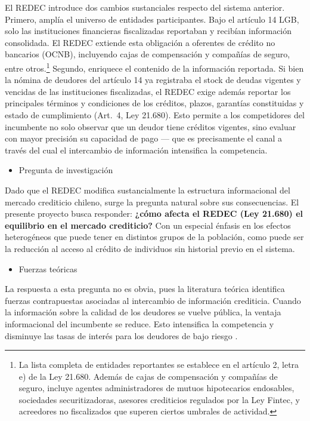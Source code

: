 \documentclass[11pt]{article}
\theoremstyle{plain}
\theoremstyle{plain}
\begin{document}
El REDEC introduce dos cambios sustanciales respecto del sistema anterior. Primero, amplía el universo de entidades participantes. Bajo el artículo 14 LGB, solo las instituciones financieras fiscalizadas reportaban y recibían información consolidada. El REDEC extiende esta obligación a oferentes de crédito no bancarios (OCNB), incluyendo cajas de compensación y compañías de seguro, entre otros.\footnote{La lista completa de entidades reportantes se establece en el artículo 2, letra e) de la Ley 21.680. Además de cajas de compensación y compañías de seguro, incluye agentes administradores de mutuos hipotecarios endosables, sociedades securitizadoras, asesores crediticios regulados por la Ley Fintec, y acreedores no fiscalizados que superen ciertos umbrales de actividad.} Segundo, enriquece el contenido de la información reportada. Si bien la nómina de deudores del artículo 14 ya registraba el stock de deudas vigentes y vencidas de las instituciones fiscalizadas, el REDEC exige además reportar los principales términos y condiciones de los créditos, plazos, garantías constituidas y estado de cumplimiento (Art.\ 4, Ley 21.680). Esto permite a los competidores del incumbente no solo observar que un deudor tiene créditos vigentes, sino evaluar con mayor precisión su capacidad de pago --- que es precisamente el canal a través del cual el intercambio de información intensifica la competencia.

\begin{itemize}
    \item Pregunta de investigación
\end{itemize}
Dado que el REDEC modifica sustancialmente la estructura informacional del mercado crediticio chileno, surge la pregunta natural sobre sus consecuencias. El presente proyecto busca responder: \textbf{¿cómo afecta el REDEC (Ley 21.680) el equilibrio en el mercado crediticio?} Con un especial énfasis en los efectos heterogéneos que puede tener en distintos grupos de la población, como puede ser la reducción al acceso al crédito de individuos sin historial previo en el sistema.

\begin{itemize}
    \item Fuerzas teóricas
\end{itemize}
La respuesta a esta pregunta no es obvia, pues la literatura teórica identifica fuerzas contrapuestas asociadas al intercambio de información crediticia. Cuando la información sobre la calidad de los deudores se vuelve pública, la ventaja informacional del incumbente se reduce. Esto intensifica la competencia y disminuye las tasas de interés para los deudores de bajo riesgo \parencite{sharpe_asymmetric_1990, petersen_effect_1995}.
\end{document}
